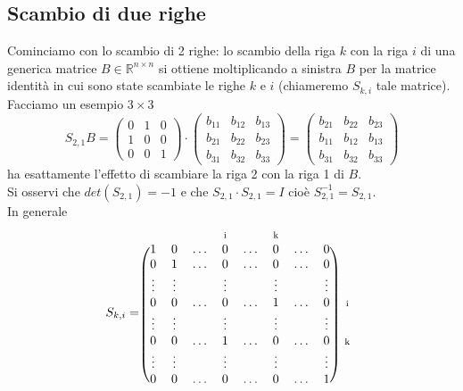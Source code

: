 \subsection{Scambio di due righe}
Cominciamo con lo scambio di 2 righe: lo scambio della riga $k$ con la riga $i$ di una generica matrice $B\in\mathbb{R}^{n\times n}$ si ottiene moltiplicando a sinistra $B$ per la matrice identità in cui sono state scambiate le righe $k$ e $i$ (chiameremo $S_{k,i}$ tale matrice).\\Facciamo un esempio $3\times 3$
\begin{equation*}
    S_{2,1}B=
    \begin{pmatrix}
        0 & 1 & 0 \\
        1 & 0 & 0 \\
        0 & 0 & 1
    \end{pmatrix} \cdot \begin{pmatrix}
        b_{11} & b_{12} & b_{13} \\
        b_{21} & b_{22} & b_{23} \\
        b_{31} & b_{32} & b_{33}
    \end{pmatrix}=\begin{pmatrix}
        b_{21} & b_{22} & b_{23} \\
        b_{11} & b_{12} & b_{13} \\
        b_{31} & b_{32} & b_{33}
    \end{pmatrix}
\end{equation*}
ha esattamente l'effetto di scambiare la riga 2 con la riga 1 di $B$.\\Si osservi che $det(S_{2,1})=-1$ e che $S_{2,1}\cdot S_{2,1}= I$ cioè $S_{2,1}^{-1}=S_{2,1}$.\\
In generale
\[
    S_{k,i}=\begin{blockarray}{ccccccccc}
        & & & \matindex{i} & &  \matindex{k} & & \\
        \begin{block}{(cccccccc)c}
        1 & 0 & \dots & 0 & \dots & 0 & \dots & 0 \\
        0 & 1 & \dots & 0 & \dots & 0 & \dots & 0 \\
        \vdots & \vdots &  & \vdots &  & \vdots &  & \vdots \\
        0 & 0 & \dots & 0 & \dots & 1 & \dots & 0 & \matindex{i} \\
        \vdots & \vdots &  & \vdots &  & \vdots &  & \vdots \\
        0 & 0 & \dots & 1 & \dots & 0 & \dots & 0 & \matindex{k} \\
        \vdots & \vdots &  & \vdots &  & \vdots &  & \vdots \\
        0 & 0 & \dots & 0 & \dots & 0 & \dots & 1 \\
        \end{block}
    \end{blockarray}
\]

